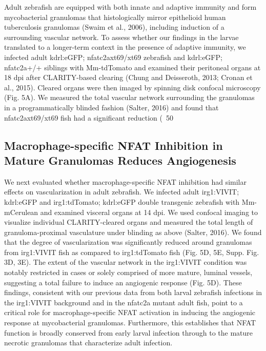 Adult zebrafish are equipped with both innate and adaptive immunity and form mycobacterial granulomas that histologically mirror epithelioid human tuberculosis granulomas (Swaim et al., 2006), including induction of a surrounding vascular network. To assess whether our findings in the larvae translated to a longer-term context in the presence of adaptive immunity, we infected adult kdrl:eGFP; nfatc2axt69/xt69 zebrafish and kdrl:eGFP; nfatc2a+/+ siblings with Mm-tdTomato and examined their peritoneal organs at 18 dpi after CLARITY-based clearing (Chung and Deisseroth, 2013; Cronan et al., 2015). Cleared organs were then imaged by spinning disk confocal microscopy (Fig. 5A). We measured the total vascular network surrounding the granulomas in a programmatically blinded fashion (Salter, 2016) and found that nfatc2axt69/xt69 fish had a significant reduction (~50%

\subsection{Macrophage-specific NFAT Inhibition in Mature Granulomas Reduces Angiogenesis}

We next evaluated whether macrophage-specific NFAT inhibition had similar effects on vascularization in adult zebrafish. We infected adult irg1:VIVIT; kdrl:eGFP and irg1:tdTomato; kdrl:eGFP double transgenic zebrafish with Mm-mCerulean and examined visceral organs at 14 dpi. We used confocal imaging to visualize individual CLARITY-cleared organs and measured the total length of granuloma-proximal vasculature under blinding as above (Salter, 2016). We found that the degree of vascularization was significantly reduced around granulomas from irg1:VIVIT fish as compared to irg1:tdTomato fish (Fig. 5D, 5E, Supp. Fig. 3D, 3E). The extent of the vascular network in the irg1:VIVIT condition was notably restricted in cases or solely comprised of more mature, luminal vessels, suggesting a total failure to induce an angiogenic response (Fig. 5D). These findings, consistent with our previous data from both larval zebrafish infections in the irg1:VIVIT background and in the nfatc2a mutant adult fish, point to a critical role for macrophage-specific NFAT activation in inducing the angiogenic response at mycobacterial granulomas. Furthermore, this establishes that NFAT function is broadly conserved from early larval infection through to the mature necrotic granulomas that characterize adult infection.

